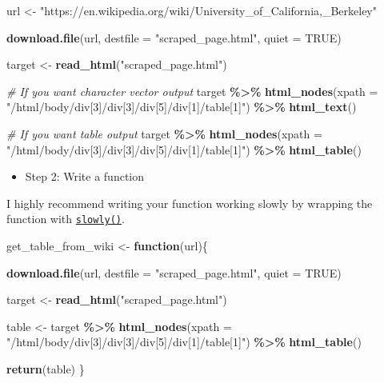 \documentclass[
]{book}
\newenvironment{Shaded}{\begin{snugshade}}{\end{snugshade}}
\newcommand{\CommentTok}[1]{\textcolor[rgb]{0.56,0.35,0.01}{\textit{#1}}}
\newcommand{\ControlFlowTok}[1]{\textcolor[rgb]{0.13,0.29,0.53}{\textbf{#1}}}
\newcommand{\DataTypeTok}[1]{\textcolor[rgb]{0.13,0.29,0.53}{#1}}
\newcommand{\KeywordTok}[1]{\textcolor[rgb]{0.13,0.29,0.53}{\textbf{#1}}}
\newcommand{\NormalTok}[1]{#1}
\newcommand{\OperatorTok}[1]{\textcolor[rgb]{0.81,0.36,0.00}{\textbf{#1}}}
\newcommand{\OtherTok}[1]{\textcolor[rgb]{0.56,0.35,0.01}{#1}}
\newcommand{\StringTok}[1]{\textcolor[rgb]{0.31,0.60,0.02}{#1}}
\providecommand{\tightlist}{%
  \setlength{\itemsep}{0pt}\setlength{\parskip}{0pt}}
\begin{document}
\begin{Shaded}
\begin{Highlighting}[]
\NormalTok{url \textless{}{-}}\StringTok{ "https://en.wikipedia.org/wiki/University\_of\_California,\_Berkeley"}

\KeywordTok{download.file}\NormalTok{(url, }\DataTypeTok{destfile =} \StringTok{"scraped\_page.html"}\NormalTok{, }\DataTypeTok{quiet =} \OtherTok{TRUE}\NormalTok{)}

\NormalTok{target \textless{}{-}}\StringTok{ }\KeywordTok{read\_html}\NormalTok{(}\StringTok{"scraped\_page.html"}\NormalTok{)}

\CommentTok{\# If you want character vector output}
\NormalTok{target }\OperatorTok{\%\textgreater{}\%}
\StringTok{  }\KeywordTok{html\_nodes}\NormalTok{(}\DataTypeTok{xpath =} \StringTok{"/html/body/div[3]/div[3]/div[5]/div[1]/table[1]"}\NormalTok{) }\OperatorTok{\%\textgreater{}\%}
\StringTok{  }\KeywordTok{html\_text}\NormalTok{() }

\CommentTok{\# If you want table output }
\NormalTok{target }\OperatorTok{\%\textgreater{}\%}
\StringTok{  }\KeywordTok{html\_nodes}\NormalTok{(}\DataTypeTok{xpath =} \StringTok{"/html/body/div[3]/div[3]/div[5]/div[1]/table[1]"}\NormalTok{) }\OperatorTok{\%\textgreater{}\%}
\StringTok{  }\KeywordTok{html\_table}\NormalTok{()}
\end{Highlighting}
\end{Shaded}

\begin{itemize}
\tightlist
\item
  Step 2: Write a function
\end{itemize}

I highly recommend writing your function working slowly by wrapping the function with \href{https://purrr.tidyverse.org/reference/insistently.html}{\texttt{slowly()}}.

\begin{Shaded}
\begin{Highlighting}[]
\NormalTok{get\_table\_from\_wiki \textless{}{-}}\StringTok{ }\ControlFlowTok{function}\NormalTok{(url)\{}
  
  \KeywordTok{download.file}\NormalTok{(url, }\DataTypeTok{destfile =} \StringTok{"scraped\_page.html"}\NormalTok{, }\DataTypeTok{quiet =} \OtherTok{TRUE}\NormalTok{)}

\NormalTok{  target \textless{}{-}}\StringTok{ }\KeywordTok{read\_html}\NormalTok{(}\StringTok{"scraped\_page.html"}\NormalTok{)}
  
\NormalTok{  table \textless{}{-}}\StringTok{ }\NormalTok{target }\OperatorTok{\%\textgreater{}\%}
\StringTok{    }\KeywordTok{html\_nodes}\NormalTok{(}\DataTypeTok{xpath =} \StringTok{"/html/body/div[3]/div[3]/div[5]/div[1]/table[1]"}\NormalTok{) }\OperatorTok{\%\textgreater{}\%}
\StringTok{    }\KeywordTok{html\_table}\NormalTok{() }
  
  \KeywordTok{return}\NormalTok{(table)}
\NormalTok{\}}
\end{Highlighting}
\end{Shaded}
\end{document}
